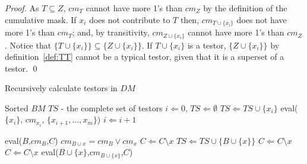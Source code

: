\documentclass[citeauthoryear]{llncs}
\begin{document}
	\begin{proof}
		As $T \subseteq Z$, $cm_T$ cannot have more 1's than $cm_Z$ by the definition of the cumulative mask.
		If $x_i$ does not contribute to $T$ then, $cm_{T \cup \lbrace x_i \rbrace}$ does not have more 1's than
		$cm_T$; and, by transitivity, $cm_{Z \cup \lbrace x_i \rbrace}$ cannot have more 1's than $cm_Z$. 
		Notice that  $\lbrace T \cup \lbrace x_i \rbrace\rbrace \subseteq \lbrace Z \cup \lbrace x_i \rbrace\rbrace$.
		If $T \cup \lbrace x_i \rbrace$ is a testor, $\lbrace Z \cup \lbrace x_i \rbrace\rbrace$ by 
		definition~\ref{def:TT} 	cannot be a typical testor, given that it is a superset of a testor.
	\qed
	\end{proof}
	
	\renewcommand{\algorithmicrequire}{\textbf{Input:}}
	\renewcommand{\algorithmicensure}{\textbf{Output:}}
	\begin{algorithm}
	\caption{Recursively calculate testors in $DM$}
	\label{alg1}
	\begin{multicols}{2}
	\begin{algorithmic}[1]
	  \REQUIRE Sorted $BM$
	  \ENSURE $TS$ - the complete set of testors
	  \STATE $i \Leftarrow 0$, $TS \Leftarrow \emptyset$
	  \label{line:firstrow}
	  	\label{line:singleT}
	  		\STATE $TS \Leftarrow TS\cup \lbrace x_i \rbrace$
	  	\ELSE
	  		\STATE eval($\lbrace x_i \rbrace$, $cm_{x_i}$, $\lbrace x_{i+1},..., x_m\rbrace$)\label{line:eval}
	  	\ENDIF
	  	\STATE $i \Leftarrow i+1$
	  \ENDWHILE
	  \item[] \item[] \item[] \item[] \item[]
	  \STATE eval($B$,$cm_B$,$C$)
	  	\STATE $cm_{B\cup x}=cm_B \vee cm_x$
	  	\label{line:contrib}
	  			\STATE $C \Leftarrow C\setminus x$\label{line:remT} 
	  			\STATE $TS \Leftarrow TS\cup\lbrace B\cup \lbrace x\rbrace \rbrace$
	  		\ENDIF
	  	\ELSE
	  		\STATE $C \Leftarrow C\setminus x$\label{line:remNoContrib} 
	  	\ENDIF
	  \ENDFOR
	  	\STATE $C \Leftarrow C\setminus x$
	  	\STATE eval($B\cup \lbrace x\rbrace$,$cm_{B\cup \lbrace x\rbrace}$,$C$)\label{line:recursive} 
	  \ENDFOR
	\end{algorithmic}
	\end{multicols}
	\end{algorithm}
	
\end{document}
